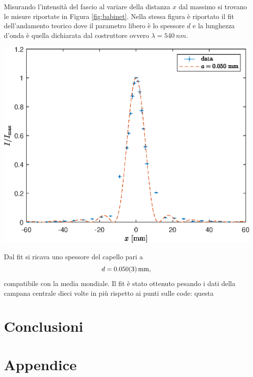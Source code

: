 \documentclass[10pt,oneside,a4paper]{article}
\newenvironment{Figure}
  {\par\medskip\noindent\minipage{\linewidth}}
  {\endminipage\par\medskip}
\begin{document}
\begin{multicols}{2}
Misurando l'intensità del fascio al variare della distanza $x$ dal massimo si trovano le misure riportate in Figura \ref{fig:babinet}. Nella stessa figura è riportato il fit dell'andamento teorico dove il parametro libero è lo spessore $d$ e la lunghezza d'onda è quella dichiarata dal costruttore ovvero $\lambda = \SI{540}{nm}$.
\begin{Figure}
	\begin{center}
	\includegraphics[width=1.1\linewidth]{babinet.eps}
	\label{fig:babinet}
	\end{center}
\end{Figure}

Dal fit si ricava uno spessore del capello pari a 
\[
	d = \SI{0.050 \pm 0.003}{mm},
\]
compatibile con la media mondiale.
Il fit è stato ottenuto pesando i dati della campana centrale dieci volte in più rispetto ai punti sulle code: questa 

\section{Conclusioni}




\end{multicols}


\newpage
\section{Appendice}
\end{document}
